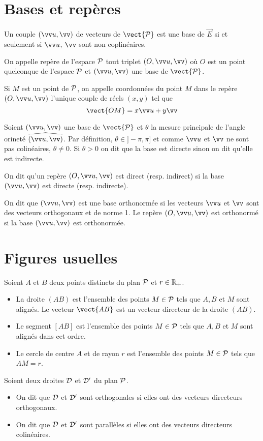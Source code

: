 \section{Bases et repères}

Un couple $(\vu,\vv)$ de vecteurs de $\vect{\P}$ est une base de $\vec{E}$ si et seulement si $\vu$, $\vv$ sont non coplinéaires. 

\begin{defdef}
  On appelle repère de l'espace $\P$ tout triplet $(O,\vu,\vv)$ où $O$ est un point quelconque de l'espace $\P$ et $(\vu,\vv)$ une base de $\vect{\P}$.

Si $M$ est un point de $\P$, on appelle coordonnées du point $M$ dans le repère $(O,\vu,\vv)$ l'unique couple de réels $(x,y)$ tel que
\begin{equation}
  \vect{OM}=x\vu+y\vv
\end{equation}
\end{defdef}

Soient $(\vu,\vv)$ une base de $\vect{\P}$ et $\theta$ la mesure principale de l'angle orineté $\widehat{(\vu,\vv)}$. Par définition, $\theta \in ]-\pi, \pi]$ et comme $\vu$ et $\vv$ ne sont pas colinéaires, $\theta \neq 0$. Si $\theta >0$ on dit que la base est directe sinon on dit qu'elle est indirecte.

\begin{defdef}
  On dit qu'un repère $(O,\vu,\vv)$ est direct (resp. indirect) si la base $(\vu,\vv)$ est directe (resp. indirecte).
\end{defdef}

\begin{defdef}
  On dit que $(\vu,\vv)$ est une base orthonormée si les vecteurs $\vu$ et $\vv$ sont des vecteurs orthogonaux et de norme 1. Le repère $(O,\vu,\vv)$ est orthonormé si la base $(\vu,\vv)$ est orthonormée.
\end{defdef}

\section{Figures usuelles}

Soient $A$ et $B$ deux points distincts du plan $\P$ et $r \in \R_+$.
\begin{itemize}
\item La droite $(AB)$ est l'ensemble des points $M \in \P$ tels que $A, B$ et $M$ sont alignés. Le vecteur $\vect{AB}$ est un vecteur directeur de la droite $(AB)$.
\item Le segment $[AB]$ est l'ensemble des points $M \in \P$ tels que $A, B$ et $M$ sont alignés dans cet ordre.
\item Le cercle de centre $A$ et de rayon $r$ est l'ensemble des points $M \in \P$ tels que $AM=r$.
\end{itemize}
Soient deux droites $\Dr$ et $\Dr'$ du plan $\P$.
\begin{itemize}
\item On dit que $\Dr$ et $\Dr'$ sont orthogonales si elles ont des vecteurs directeurs orthogonaux.
\item On dit que $\Dr$ et $\Dr'$ sont parallèles si elles ont des vecteurs directeurs colinéaires.
\end{itemize}
